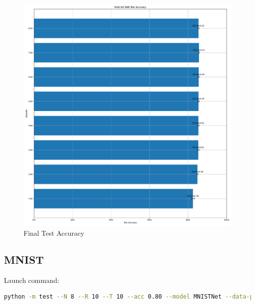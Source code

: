         \begin{figure}[H]
            \centering
            \includegraphics[width=\textwidth]{../standard/FashionMNIST/plots/fashionmnist_final_acc.pdf}
            \caption{Final Test Accuracy}
        \end{figure}

    \subsection{MNIST}
    \label{appendix:accuracy_curves_mnist}
        Launch command: 
        \begin{lstlisting}[language=Bash, basicstyle=\small, breaklines=true]
python -m test --N 8 --R 10 --T 10 --acc 0.80 --model MNISTNet --data-path /scratch/zyi/codeSpace/data --dataset MNIST --batch-size 128 --opt adam --lr 2e-3 --lr-scheduler none --epochs 5 --lr-warmup-epochs 0 --output-dir /scratch/zyi/codeSpace/MultibitSpikes --mixup-alpha 0.0 --cutmix-alpha 0.0 --label-smoothing 0.0 --disable-amp
        \end{lstlisting}

